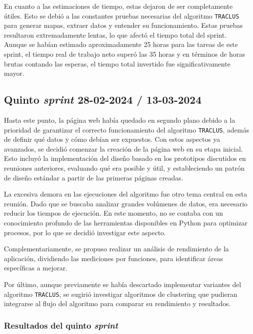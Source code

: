 En cuanto a las estimaciones de tiempo, estas dejaron de ser completamente útiles. Esto se debió a las constantes pruebas necesarias del algoritmo \texttt{TRACLUS} para generar mapas, extraer datos y entender su funcionamiento. Estas pruebas resultaron extremadamente lentas, lo que afectó el tiempo total del sprint. Aunque se habían estimado aproximadamente 25 horas para las tareas de este sprint, el tiempo real de trabajo neto superó las 35 horas y en términos de horas brutas contando las esperas, el tiempo total invertido fue significativamente mayor.

\subsection{Quinto \textit{sprint} 28-02-2024 / 13-03-2024}

Hasta este punto, la página web había quedado en segundo plano debido a la prioridad de garantizar el correcto funcionamiento del algoritmo \texttt{TRACLUS}, además de definir qué datos y cómo debían ser expuestos. Con estos aspectos ya avanzados, se decidió comenzar la creación de la página web en su etapa inicial. Esto incluyó la implementación del diseño basado en los prototipos discutidos en reuniones anteriores, evaluando qué era posible y útil, y estableciendo un patrón de diseño estándar a partir de las primeras páginas creadas.

La excesiva demora en las ejecuciones del algoritmo fue otro tema central en esta reunión. Dado que se buscaba analizar grandes volúmenes de datos, era necesario reducir los tiempos de ejecución. En este momento, no se contaba con un conocimiento profundo de las herramientas disponibles en Python para optimizar procesos, por lo que se decidió investigar este aspecto.

Complementariamente, se propuso realizar un análisis de rendimiento de la aplicación, dividiendo las mediciones por funciones, para identificar áreas específicas a mejorar.

Por último, aunque previamente se había descartado implementar variantes del algoritmo \texttt{TRACLUS}, se sugirió investigar algoritmos de clustering que pudieran integrarse al flujo del algoritmo para comparar su rendimiento y resultados.

\subsubsection{Resultados del quinto \textit{sprint}}

